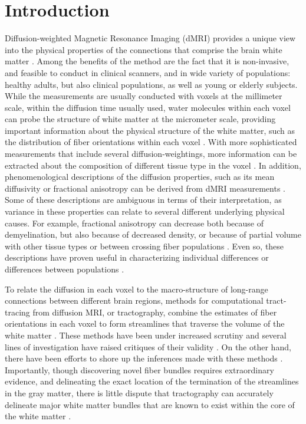 \section*{Introduction}

Diffusion-weighted Magnetic Resonance Imaging (dMRI) provides a unique view into
the physical properties of the connections that comprise the brain white matter
\cite{wandell2016clarifying}. Among the benefits of the method are the fact that
it is non-invasive, and feasible to conduct in clinical scanners, and in wide
variety of populations: healthy adults, but also clinical populations, as well
as young or elderly subjects. While the measurements are usually conducted with
voxels at the millimeter scale, within the diffusion time usually used, water
molecules within each voxel can probe the structure of white matter at the
micrometer scale, providing important information about the physical structure
of the white matter, such as the distribution of fiber orientations within each
voxel \cite{Frank2002-iz, Frank2001-xf}. With more sophisticated measurements
that include several diffusion-weightings, more information can be extracted
about the composition of different tissue type in the voxel
\cite{Jeurissen2014-ab, Kaden2016-ho}. In addition, phenomenological
descriptions of the diffusion properties, such as its mean diffusivity or
fractional anisotropy can be derived from dMRI measurements
\cite{Pierpaoli1996-vj}. Some of these descriptions are ambiguous in terms of
their interpretation, as variance in these properties can relate to several
different underlying physical causes. For example, fractional anisotropy can
decrease both because of demyelination, but also because of decreased density,
or because of partial volume with other tissue types or between crossing fiber
populations \cite{Beaulieu1996-fn, Beaulieu2002-tl}. Even so, these descriptions
have proven useful in characterizing individual differences or differences
between populations \cite{}.

To relate the diffusion in each voxel to the macro-structure of long-range
connections between different brain regions, methods for computational
tract-tracing from diffusion MRI, or tractography, combine the estimates of
fiber orientations in each voxel to form streamlines that traverse the volume of
the white matter \cite{Conturo1999-je, Mori2002-qi}. These methods have been
under increased scrutiny and several lines of investigation have raised
critiques of their validity \cite{Maier-Hein2017-vb, Thomas2014-ki}. On the
other hand, there have been efforts to shore up the inferences made with these
methods \cite{Pestilli2014NatMeth, Takemura2016-sh, Smith2013-nc, Smith2015-cx,
Smith2015-zt, Rheault2018-wk}. Importantly, though discovering novel fiber
bundles requires extraordinary evidence, and delineating the exact location of
the termination of the streamlines in the gray matter, there is little dispute
that tractography can accurately delineate major white matter bundles that are
known to exist within the core of the white matter \cite{Maier-Hein2017-vb}.

